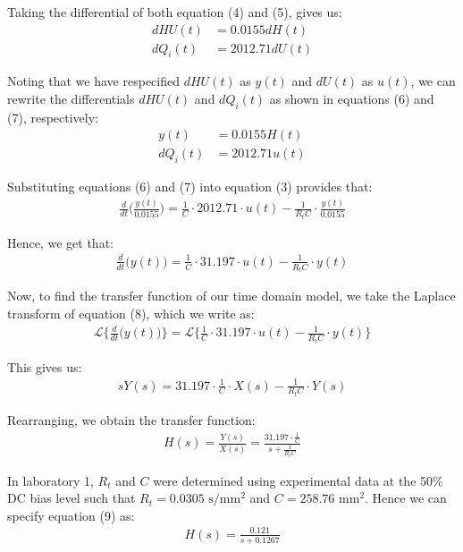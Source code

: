 \documentclass{article}
\begin{document}
Taking the differential of both equation (4) and (5), gives us:
\begin{align*}
	dHU(t) &= 0.0155dH(t)\\
	dQ_i(t) &= 2012.71dU(t)
\end{align*}

\newpage

Noting that we have respecified $dHU(t)$ as $y(t)$ and $dU(t)$ as $u(t)$, we can rewrite the differentials $dHU(t)$ and $dQ_i(t)$ as shown in equations (6) and (7), respectively:
\begin{align}
	y(t) &= 0.0155H(t)\\
	dQ_i(t) &= 	2012.71u(t)
\end{align}

Substituting equations (6) and (7) into equation (3) provides that:
\begin{align*}
	\frac{d}{dt}\bigg(\frac{y(t)}{0.0155}\bigg) = \frac{1}{C} \cdot 2012.71 \cdot u(t) - \frac{1}{R_tC} \cdot \frac{y(t)}{0.0155}
\end{align*}

Hence, we get that:
\begin{align}
\frac{d}{dt}\big(y(t)\big) = \frac{1}{C} \cdot 31.197 \cdot u(t) - \frac{1}{R_tC} \cdot y(t)
\end{align}

Now, to find the transfer function of our time domain model, we take the Laplace transform of equation (8), which we write as:
\begin{align*}
	\mathscr{L}\bigg\{ \frac{d}{dt}\big(y(t)\big) \bigg\} = \mathscr{L} \bigg\{ \frac{1}{C} \cdot 31.197 \cdot u(t) - \frac{1}{R_tC} \cdot y(t)  \bigg\}
\end{align*}

This gives us:
\begin{align*}
	sY(s) = 31.197 \cdot \frac{1}{C} \cdot X(s) - \frac{1}{R_tC} \cdot Y(s)
\end{align*}

Rearranging, we obtain the transfer function:
\begin{align}
	H(s) = \frac{Y(s)}{X(s)} = \frac{31.197 \cdot \frac{1}{C}}{s + \frac{1}{R_tC}}
\end{align}

In laboratory 1, $R_t$ and $C$ were determined using experimental data at the 50\% DC bias level such that $R_t = 0.0305$ $\si{\second\per\milli\meter^2}$ and $C = 258.76$ $\si{\milli\meter^2}$. Hence we can specify equation (9) as:
\begin{align*}
	H(s) = \frac{0.121}{s + 0.1267}
\end{align*}
\end{document}
